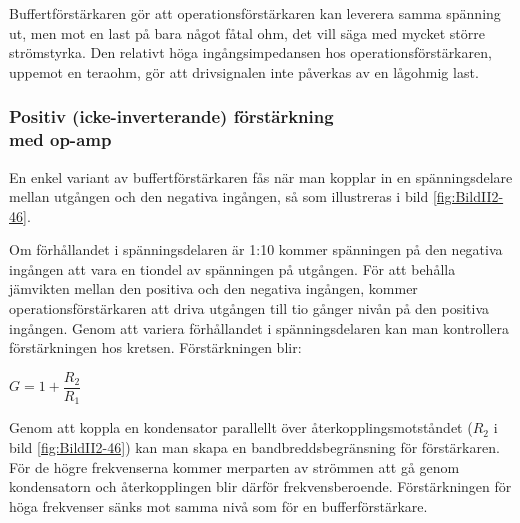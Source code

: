 Buffertförstärkaren gör att operationsförstärkaren kan leverera samma spänning
ut, men mot en last på bara något fåtal ohm, det vill säga med mycket större
strömstyrka.
Den relativt höga ingångsimpedansen hos operationsförstärkaren, uppemot en
teraohm, gör att drivsignalen inte påverkas av en lågohmig last.

\subsubsection{Positiv (icke-inverterande) förstärkning\\ med op-amp}
\label{icke-inverterande förstärkning}

En enkel variant av buffertförstärkaren fås när man kopplar in en
spänningsdelare mellan utgången och den negativa ingången, så som illustreras i
bild \ref{fig:BildII2-46}.


Om förhållandet i spänningsdelaren är 1:10 kommer spänningen på den negativa
ingången att vara en tiondel av spänningen på utgången.
För att behålla jämvikten mellan den positiva och den negativa ingången, kommer
operationsförstärkaren att driva utgången till tio gånger nivån på den positiva
ingången.
Genom att variera förhållandet i spänningsdelaren kan man kontrollera
förstärkningen hos kretsen.
Förstärkningen blir:

\(G = 1+ \dfrac{R_2}{R_1}\)

Genom att koppla en kondensator parallellt över återkopplingsmotståndet
(\(R_2\) i bild \ref{fig:BildII2-46}) kan man skapa en bandbreddsbegränsning
för förstärkaren.
För de högre frekvenserna kommer merparten av strömmen att gå genom
kondensatorn och återkopplingen blir därför frekvensberoende.
Förstärkningen för höga frekvenser sänks mot samma nivå som för en
bufferförstärkare.

